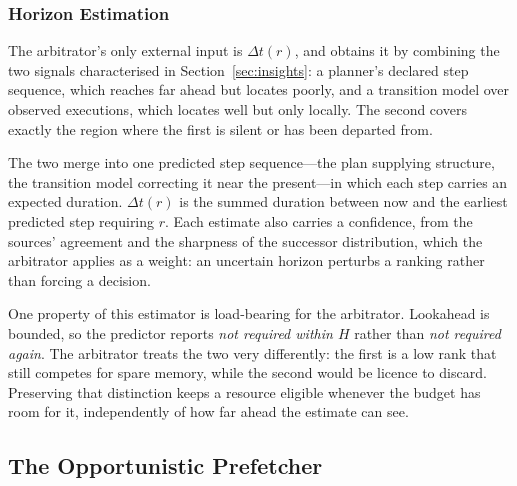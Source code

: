 \subsubsection{Horizon Estimation}
\label{sec:horizon}

The arbitrator's only external input is $\Delta t(r)$, and \sysname{} obtains
it by combining the two signals characterised in Section~\ref{sec:insights}: a
planner's declared step sequence, which reaches far ahead but locates poorly,
and a transition model over observed executions, which locates well but only
locally. The second covers exactly the region where the first is silent or has
been departed from.

The two merge into one predicted step sequence---the plan supplying structure,
the transition model correcting it near the present---in which each step
carries an expected duration. $\Delta t(r)$ is the summed duration between now
and the earliest predicted step requiring $r$. Each estimate also carries a
confidence, from the sources' agreement and the sharpness of the successor
distribution, which the arbitrator applies as a weight: an uncertain horizon
perturbs a ranking rather than forcing a decision.

One property of this estimator is load-bearing for the arbitrator. Lookahead
is bounded, so the predictor reports \emph{not required within $H$} rather
than \emph{not required again}. The arbitrator treats the two very
differently: the first is a low rank that still competes for spare memory,
while the second would be licence to discard. Preserving that distinction
keeps a resource eligible whenever the budget has room for it, independently
of how far ahead the estimate can see.

\subsection{The Opportunistic Prefetcher}
\label{sec:prefetch}

